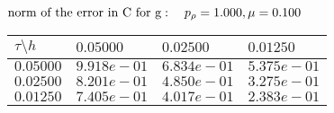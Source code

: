 $
 \text{norm of the error in C for g}: \quad p_{\rho}=1.000, \mu = 0.100 \\ $
\begin{tabular}{|p{0.6in}|p{1.2in}|p{1.2in}|p{1.2in}|} \hline
$\tau\setminus h$ & $0.05000$ & $0.02500$& $0.01250$ \\ \hline
$0.05000$ & $9.918e-01$ &$6.834e-01$ &$5.375e-01$  \\ \hline
$0.02500$ & $8.201e-01$ &$4.850e-01$ &$3.275e-01$  \\ \hline
$0.01250$ & $7.405e-01$ &$4.017e-01$ &$2.383e-01$  \\ \hline
\end{tabular}\\[20pt]
